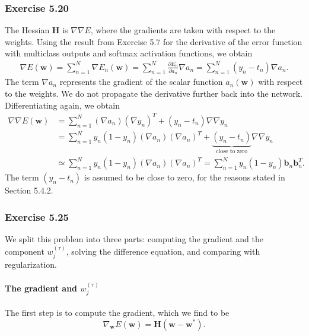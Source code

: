 \documentclass[12pt, a4paper]{article}
\newcommand{\vect}[1]{\bm{#1}}
\begin{document}
\subsubsection*{Exercise 5.20}
The Hessian $\vect{H}$ is $\nabla \nabla E$, where the gradients are taken with respect to the weights.
Using the result from Exercise 5.7 for the derivative of the error function with multiclass outputs and softmax activation functions, we obtain
\begin{align*}
	\nabla E(\vect{w}) = 
	\sum_{n=1}^{N} \nabla E_n(\vect{w})
	=
	\sum_{n=1}^{N} \frac{\partial E_n }{\partial a_n} \nabla a_n
	=
	\sum_{n=1}^{N} (y_n - t_n) \nabla a_n.
\end{align*}
The term $\nabla a_n$ represents the gradient of the scalar function $a_n(\vect{w})$ with respect to the weights.
We do not propagate the derivative further back into the network.
Differentiating again, we obtain
\begin{align*}
\nabla \nabla E(\vect{w}) 
& = \sum_{n=1}^{N} \left( \nabla a_n \right) \left( \nabla y_n \right)^T
+ (y_n - t_n) \nabla \nabla y_n \\
& = \sum_{n=1}^{N} y_n (1 - y_n) \left( \nabla a_n \right) \left( \nabla a_n \right)^T
+ \underbrace{(y_n - t_n)}_{\text{close to zero}} \nabla \nabla y_n \\
&\simeq \sum_{n=1}^{N} y_n (1 - y_n) \left( \nabla a_n \right) \left( \nabla a_n \right)^T = \sum_{n=1}^{N} y_n (1 - y_n) \vect{b}_n \vect{b}_n^T
.
\end{align*}
The term $(y_n - t_n)$ is assumed to be close to zero, for the reasons stated in Section 5.4.2.


\subsubsection*{Exercise 5.25}
We split this problem into three parts:
computing the gradient and the component $w^{(\tau)}_j$,
solving the difference equation,
and comparing with regularization.


\paragraph{The gradient and $w^{(\tau)}_j$} The first step is to compute the gradient, which we find to be
\begin{equation*}
	\nabla_{\vect{w}} E(\vect{w}) = \vect{H} (\vect{w} - \vect{w}^*).
\end{equation*}
\end{document}
